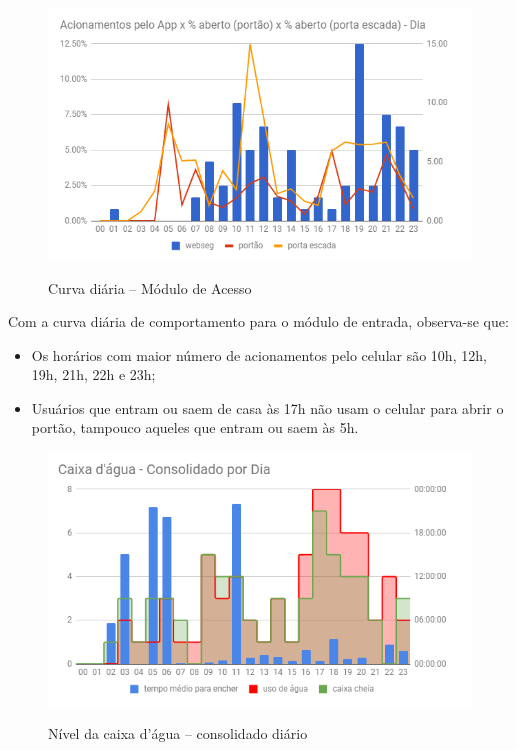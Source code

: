 \begin{figure}[H]
	\centering
	\caption{Curva diária -- Módulo de Acesso}
	\includegraphics[width=1.0\textwidth]{EntradaConsolidadoDia}
	\label{fig:EntradaConsolidadoDia}
\end{figure}

Com a curva diária de comportamento para o módulo de entrada, observa-se que:

\begin{itemize}
	\item Os horários com maior número de acionamentos pelo celular são 10h, 12h, 19h, 21h, 22h e 23h;
	\item Usuários que entram ou saem de casa às 17h não usam o celular para abrir o portão, tampouco aqueles que entram ou saem às 5h.
\end{itemize}

\begin{figure}[H]
	\centering
	\caption{Nível da caixa d'água -- consolidado diário}
	\includegraphics[width=1.0\textwidth]{CxAguaDia}
	\label{fig:CxAguaDia}
\end{figure}

